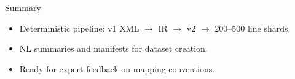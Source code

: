 \documentclass[aspectratio=169]{beamer}
\begin{document}
\begin{frame}{Summary}
\begin{itemize}
  \item Deterministic pipeline: v1 XML $\rightarrow$ IR $\rightarrow$ v2 $\rightarrow$ 200--500 line shards.
  \item NL summaries and manifests for dataset creation.
  \item Ready for expert feedback on mapping conventions.
\end{itemize}
\end{frame}
\end{document}
